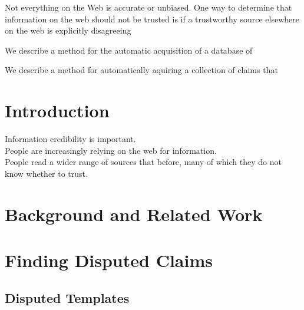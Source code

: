 \documentclass{www2010-submission}
\newcommand{\todo}[1]{}
\newcommand{\x}[1]{{\color{blue} #1}\\}
\begin{document}

Not everything on the Web is accurate or unbiased. One way to determine that information on the web should not be trusted is if a trustworthy source elsewhere on the web is explicitly disagreeing 

We describe a method for the automatic acquisition of a database of 

We describe a method for automatically aquiring a collection of claims that 







\section{Introduction}

\x{Information credibility is important.}
\x{People are increasingly relying on the web for information.}
\x{People read a wider range of sources that before, many of which they do not know whether to trust.}

\section{Background and Related Work}




\section{Finding Disputed Claims}

\subsection{Disputed Templates}
\end{document}
